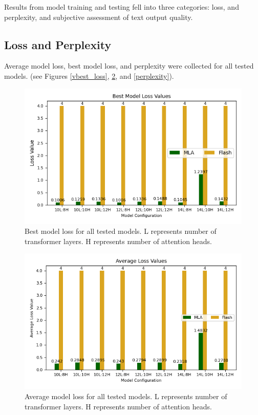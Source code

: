 Results from model training and testing fell into three categories: loss, and perplexity, and subjective assessment of text output quality.

\subsection{Loss and Perplexity}
Average model loss, best model loss, and perplexity were collected for all tested models. (see Figures \ref{vbest_loss}, \ref{avg_loss}, and \ref{perplexity}).

\begin{figure}[H]
    \centering
    \includegraphics[width=\linewidth]{sections/images/best_loss.png}
    \caption{Best model loss for all tested models. L represents number of transformer layers. H represents number of attention heads.}
    \label{best_loss}
\end{figure}

\begin{figure}[H]
    \centering
    \includegraphics[width=\linewidth]{sections/images/avg_loss.png}
    \caption{Average model loss for all tested models. L represents number of transformer layers. H represents number of attention heads.}
    \label{avg_loss}
\end{figure}

